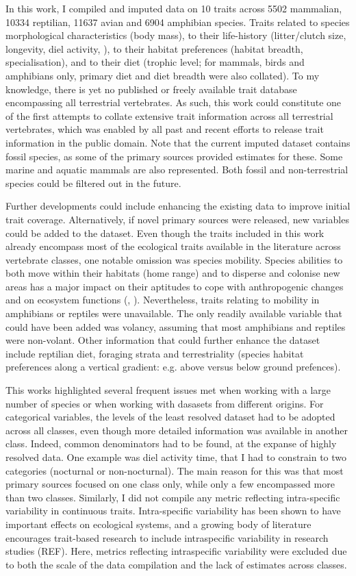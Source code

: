 In this work, I compiled and imputed data on 10 traits across 5502 mammalian, 10334 reptilian, 11637 avian and 6904 amphibian species. Traits related to species morphological characteristics (body mass), to their life-history (litter/clutch size, longevity, diel activity, ), to their habitat preferences (habitat breadth, specialisation), and to their diet (trophic level; for mammals, birds and amphibians only, primary diet and diet breadth were also collated). To my knowledge, there is yet no published or freely available trait database encompassing all terrestrial vertebrates. As such, this work could constitute one of the first attempts to collate extensive trait information across all terrestrial vertebrates, which was enabled by all past and recent efforts to release trait information in the public domain. Note that the current imputed dataset contains fossil species, as some of the primary sources provided estimates for these. Some marine and aquatic mammals are also represented. Both fossil and non-terrestrial species could be filtered out in the future.

Further developments could include enhancing the existing data to improve initial trait coverage. Alternatively, if novel primary sources were released, new variables could be added to the dataset. Even though the traits included in this work already encompass most of the ecological traits available in the literature across vertebrate classes, one notable omission was species mobility. Species abilities to both move within their habitats (home range) and to disperse and colonise new areas has a major impact on their aptitudes to cope with anthropogenic changes and on ecosystem functions (\cite{Tucker2018}, \cite{Schloss2012b}). Nevertheless, traits relating to mobility in amphibians or reptiles were unavailable. The only readily available variable that could have been added was volancy, assuming that most amphibians and reptiles were non-volant. Other  information that could further enhance the dataset include reptilian diet, foraging strata and terrestriality (species habitat preferences along a vertical gradient: e.g. above versus below ground prefences).

This works highlighted several frequent issues met when working with a large number of species or when working with dasasets from different origins. For categorical variables, the levels of the least resolved dataset had to be adopted across all classes, even though more detailed information was available in another class. Indeed, common denominators had to be found, at the expanse of highly resolved data. One example was diel activity time, that I had to constrain to two categories (nocturnal or non-nocturnal). The main reason for this was that most primary sources focused on one class only, while only a few encompassed more than two classes. Similarly, I did not compile any metric reflecting intra-specific variability in continuous traits. Intra-specific variability has been shown to have important effects on ecological systems, and a growing body of literature encourages trait-based research to include intraspecific variability in research studies (REF). Here, metrics reflecting intraspecific variability were excluded due to both the scale of the data compilation and the lack of estimates across classes.

